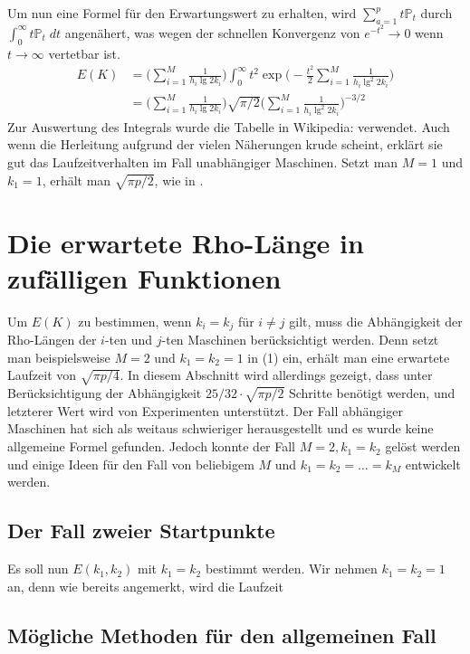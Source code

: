 \documentclass[a4paper, 10pt, ngerman]{article}
\begin{document}
Um nun eine Formel für den Erwartungswert zu erhalten, wird $\sum_{a = 1}^p t \mathbb{P}_t$ durch $\int_{0}^\infty t \mathbb{P}_t \; dt$ angenähert, was wegen der schnellen Konvergenz von $e^{-t^2} \to 0$ wenn $t \to \infty$ vertetbar ist.
\begin{align}
    E(K)
     & = \Bigg ( \sum_{i = 1}^M \frac 1 {h_i \lg 2k_i} \Bigg ) \int_{0}^{\infty} t^2 \exp \Bigg (- \frac {t^2} 2 \sum_{i = 1}^M \frac 1 {h_i \lg^2 2k_i} \Bigg ) \nonumber \\
     & = \Bigg ( \sum_{i = 1}^M \frac 1 {h_i \lg 2k_i} \Bigg ) \sqrt {\pi/2} \Bigg (\sum_{i = 1}^M \frac 1 {h_i \lg^2 2k_i} \Bigg )^{-3/2}
\end{align}
Zur Auswertung des Integrals wurde die Tabelle in Wikipedia: \cite{gint} verwendet. Auch wenn die Herleitung aufgrund der vielen Näherungen krude scheint, erklärt sie gut das Laufzeitverhalten im Fall unabhängiger Maschinen. Setzt man $M = 1$ und $k_1 = 1$, erhält man $\sqrt{\pi p / 2}$, wie in \cite{pol75}.

\section{Die erwartete Rho-Länge in zufälligen Funktionen}

Um $E(K)$ zu bestimmen, wenn $k_i = k_j$ für $i \ne j$ gilt, muss die Abhängigkeit der Rho-Längen der $i$-ten und $j$-ten Maschinen berücksichtigt werden. Denn setzt man beispielsweise $M = 2$ und $k_1 = k_2 = 1$ in (1) ein, erhält man eine erwartete Laufzeit von $\sqrt {\pi p / 4}$. In diesem Abschnitt wird allerdings gezeigt, dass unter Berücksichtigung der Abhängigkeit $25/32 \cdot \sqrt{\pi p / 2}$ Schritte benötigt werden, und letzterer Wert wird von Experimenten unterstützt. Der Fall abhängiger Maschinen hat sich als weitaus schwieriger herausgestellt und es wurde keine allgemeine Formel gefunden. Jedoch konnte der Fall $M = 2, k_1 = k_2$ gelöst werden und einige Ideen für den Fall von beliebigem $M$ und $k_1 = k_2 = \dots = k_M$ entwickelt werden.

\subsection{Der Fall zweier Startpunkte}

Es soll nun $E(k_1, k_2)$ mit $k_1 = k_2$ bestimmt werden. Wir nehmen $k_1 = k_2 = 1$ an, denn wie bereits angemerkt, wird die Laufzeit

\subsection{Mögliche Methoden für den allgemeinen Fall}
\end{document}
